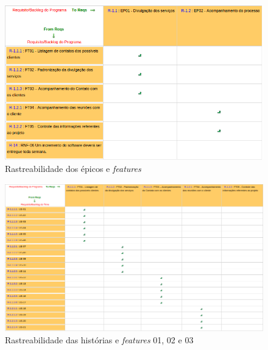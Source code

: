 \begin{figure}[!htb]
 \centering
 \includegraphics[scale= 0.5]{figuras/epft.png}
 \caption{Rastreabilidade dos épicos e \textit{features}}
 \label{fig:epft}
\end{figure}

\begin{figure}[!htb]
 \centering
 \includegraphics[scale= 0.5]{figuras/ft01e02.png}
 \caption{Rastreabilidade das histórias e \textit{features} 01, 02 e 03}
 \label{fig:ft01}
\end{figure}


